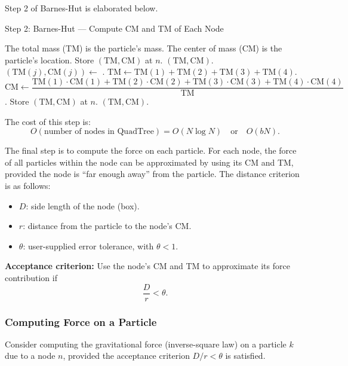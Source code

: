 \documentclass[12pt]{book}
\begin{document}
\noindent
Step 2 of Barnes-Hut is elaborated below.

\begin{algorithm}[H]
\caption{Step 2: Barnes-Hut --- Compute CM and TM of Each Node}
\begin{algorithmic}[1]
        \State The total mass (TM) is the particle’s mass.
        \State The center of mass (CM) is the particle’s location.
        \State Store $(\text{TM}, \text{CM})$ at $n$.
        \State \Return $(\text{TM}, \text{CM})$.
    \Else
        \State {}
            \State $(\text{TM}(j), \text{CM}(j)) \gets$ .
        \EndFor
        \State $\text{TM} \gets \text{TM}(1) + \text{TM}(2) + \text{TM}(3) + \text{TM}(4)$.
        \State $\text{CM} \gets \dfrac{\text{TM}(1)\cdot \text{CM}(1) + 
        \text{TM}(2)\cdot \text{CM}(2) + 
        \text{TM}(3)\cdot \text{CM}(3) + 
        \text{TM}(4)\cdot \text{CM}(4)}{\text{TM}}$.
        \State Store $(\text{TM}, \text{CM})$ at $n$.
        \State \Return $(\text{TM}, \text{CM})$.
    \EndIf
\EndFunction
\end{algorithmic}
\end{algorithm}

\noindent
The cost of this step is:
\[
O(\text{number of nodes in QuadTree}) = O(N\log N) \quad \text{or} \quad O(bN).
\]

\medskip
\noindent
The final step is to compute the force on each particle. For each node, the force of all particles within the node can be approximated by using its CM and TM, provided the node is ``far enough away'' from the particle. The distance criterion is as follows:
\begin{itemize}
    \item $D$: side length of the node (box).
    \item $r$: distance from the particle to the node’s CM.
    \item $\theta$: user-supplied error tolerance, with $\theta < 1$.
\end{itemize}

\noindent
\textbf{Acceptance criterion:} Use the node’s CM and TM to approximate its force contribution if
\[
\frac{D}{r} < \theta.
\]
\subsubsection{Computing Force on a Particle}
Consider computing the gravitational force (inverse-square law) on a particle $k$ due to a node $n$, provided the acceptance criterion $D/r < \theta$ is satisfied.  
\end{document}

